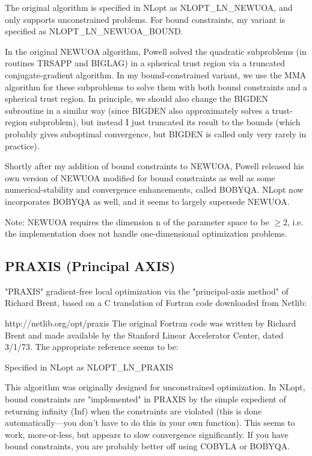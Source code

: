 The original algorithm is specified in NLopt as NLOPT\_LN\_NEWUOA, and only supports unconstrained problems. For bound constraints, my variant is specified as NLOPT\_LN\_NEWUOA\_BOUND. 

In the original NEWUOA algorithm, Powell solved the quadratic subproblems (in routines TRSAPP and BIGLAG) in a spherical trust region via a truncated conjugate-gradient algorithm. In my bound-constrained variant, we use the MMA algorithm for these subproblems to solve them with both bound constraints and a spherical trust region. In principle, we should also change the BIGDEN subroutine in a similar way (since BIGDEN also approximately solves a trust-region subproblem), but instead I just truncated its result to the bounds (which probably gives suboptimal convergence, but BIGDEN is called only very rarely in practice). 

Shortly after my addition of bound constraints to NEWUOA, Powell released his own version of NEWUOA modified for bound constraints as well as some numerical-stability and convergence enhancements, called BOBYQA. NLopt now incorporates BOBYQA as well, and it seems to largely supersede NEWUOA. 

Note: NEWUOA requires the dimension n of the parameter space to be $\geq 2$, i.e. the implementation does not handle one-dimensional optimization problems. 



\subsection{PRAXIS (Principal AXIS)}
"PRAXIS" gradient-free local optimization via the "principal-axis method" of Richard Brent, based on a C translation of Fortran code downloaded from Netlib: 

http://netlib.org/opt/praxis 
The original Fortran code was written by Richard Brent and made available by the Stanford Linear Accelerator Center, dated 3/1/73. The appropriate reference seems to be: \cite{Brent_1972}


Specified in NLopt as NLOPT\_LN\_PRAXIS 

This algorithm was originally designed for unconstrained optimization. In NLopt, bound constraints are "implemented" in PRAXIS by the simple expedient of returning infinity (Inf) when the constraints are violated (this is done automatically—you don't have to do this in your own function). This seems to work, more-or-less, but appears to slow convergence significantly. If you have bound constraints, you are probably better off using COBYLA or BOBYQA. 





